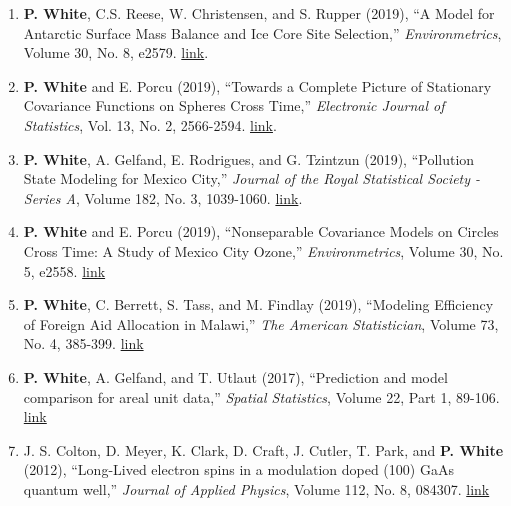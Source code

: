 \documentclass[11pt]{article}
\begin{document}
\begin{enumerate}[label=$\bullet$]


\item \textbf{P. White}, C.S. Reese, W. Christensen, and S. Rupper (2019), ``A Model for Antarctic Surface Mass Balance and Ice Core Site Selection,'' \emph{Environmetrics}, Volume 30, No. 8, e2579. \href{https://onlinelibrary.wiley.com/doi/abs/10.1002/env.2579}{link}.
\item \textbf{P. White} and E. Porcu (2019), ``Towards a Complete Picture of Stationary Covariance Functions on Spheres Cross Time,'' \emph{Electronic Journal of Statistics}, Vol. 13, No. 2, 2566-2594. \href{https://doi.org/10.1214/19-EJS1593}{link}.
\item \textbf{P. White}, A. Gelfand, E. Rodrigues, and G. Tzintzun (2019), ``Pollution State Modeling for Mexico City,'' \emph{Journal of the Royal Statistical Society - Series A}, Volume 182, No. 3, 1039-1060. \href{https://rss.onlinelibrary.wiley.com/doi/abs/10.1111/rssa.12444}{link}.
\item \textbf{P. White} and E. Porcu (2019), ``Nonseparable Covariance Models on Circles Cross Time: A Study of Mexico City Ozone,'' \emph{Environmetrics}, Volume 30, No. 5, e2558. \href{https://onlinelibrary.wiley.com/doi/full/10.1002/env.2558}{link}


\item \textbf{P. White}, C. Berrett, S. Tass, and M. Findlay (2019), ``Modeling Efficiency of Foreign Aid Allocation in Malawi,'' \emph{The American Statistician}, Volume 73, No. 4, 385-399.  \href{https://www.tandfonline.com/doi/full/10.1080/00031305.2018.1470032}{link}


\item \textbf{P. White}, A. Gelfand, and T. Utlaut (2017), ``Prediction and model comparison for areal unit data,'' \emph{Spatial Statistics}, Volume 22, Part 1, 89-106. \href{http://www.sciencedirect.com/science/article/pii/S2211675317301422}{link}


\item J. S. Colton, D. Meyer, K. Clark, D. Craft, J. Cutler, T. Park, and \textbf{P. White} (2012), ``Long-Lived electron spins in a modulation doped (100) GaAs quantum well,'' \emph{Journal of Applied Physics}, Volume 112, No. 8, 084307.  \href{http://aip.scitation.org/doi/abs/10.1063/1.4759320}{link}
\end{enumerate}
\end{document}
